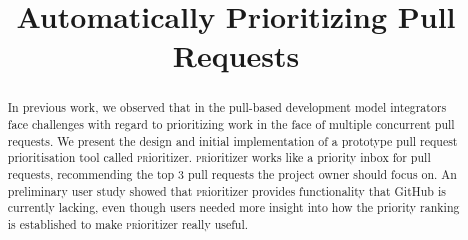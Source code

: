\documentclass[conference]{IEEEtran}
\begin{document}
\newcommand{\ghtorrent}{\textsc{ght}orrent\xspace}
\newcommand{\prioritizer}{\textsc{pr}ioritizer\xspace}
\newcommand{\api}{\textsc{api}\xspace}
\newcommand{\todo}[1]{\textcolor{red}{\textbf{\textsc{todo:}} #1}}

\newcommand{\nb}[3]{
  \fcolorbox{black}{#2}{\bfseries\sffamily\scriptsize#1}
    {\sf\small$\blacktriangleright$\textit{#3}$\blacktriangleleft$}
}

\newcommand\georgios[1]{\nb{Georgios}{yellow}{#1}}
\newcommand\andy[1]{\nb{Andy}{cyan}{#1}}
\newcommand\erik[1]{\nb{Erik}{magenta}{#1}}

\newcommand{\hassanbox}[1]
{
  \vspace{0.29em}
  \noindent
  \fbox{
  \begin{minipage}{0.46\textwidth}
    \emph{\noindent #1}
    \end{minipage}
}}

\newcommand{\resp}[2]{{\sc R#1:} ``\emph{#2}''}
\newcommand{\respnum}[1]{{\sc R#1}}
\newcommand{\code}[1]{{\textsl{#1}}}

\title{Automatically Prioritizing Pull Requests}

\author{
}


\author{
\and
{}
\and
{}
}

\maketitle

\begin{abstract}

In previous work, we observed that in the pull-based development model integrators face challenges with regard to prioritizing work in the face of multiple concurrent pull requests. We present the design and initial implementation of a prototype pull request prioritisation tool called \prioritizer. \prioritizer works like a priority inbox for pull requests, recommending the top 3 pull requests the project owner should focus on. An preliminary user study showed that \prioritizer provides functionality that GitHub is currently lacking, even though users needed more insight into how the priority ranking is established to make \prioritizer really useful.

\end{abstract}
\end{document}
